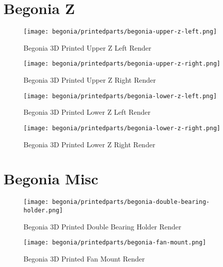 \section{Begonia Z}

\begin{figure}[H]
\centering
\texttt{[image: begonia/printedparts/begonia-upper-z-left.png]}
\caption{Begonia 3D Printed Upper Z Left Render}
\label{fig:begupperzleft}
\end{figure}

\begin{figure}[H]
\centering
\texttt{[image: begonia/printedparts/begonia-upper-z-right.png]}
\caption{Begonia 3D Printed Upper Z Right Render}
\label{fig:begupperzright}
\end{figure}

\begin{figure}[H]
\centering
\texttt{[image: begonia/printedparts/begonia-lower-z-left.png]}
\caption{Begonia 3D Printed Lower Z Left Render}
\label{fig:beglowzleft}
\end{figure}

\begin{figure}[H]
\centering
\texttt{[image: begonia/printedparts/begonia-lower-z-right.png]}
\caption{Begonia 3D Printed Lower Z Right Render}
\label{fig:beglowzright}
\end{figure}


\section{Begonia Misc}

\begin{figure}[H]
\centering
\texttt{[image: begonia/printedparts/begonia-double-bearing-holder.png]}
\caption{Begonia 3D Printed Double Bearing Holder Render}
\label{fig:begdoublebearingholder}
\end{figure}

\begin{figure}[H]
\centering
\texttt{[image: begonia/printedparts/begonia-fan-mount.png]}
\caption{Begonia 3D Printed Fan Mount Render}
\label{fig:begfanmount}
\end{figure}

